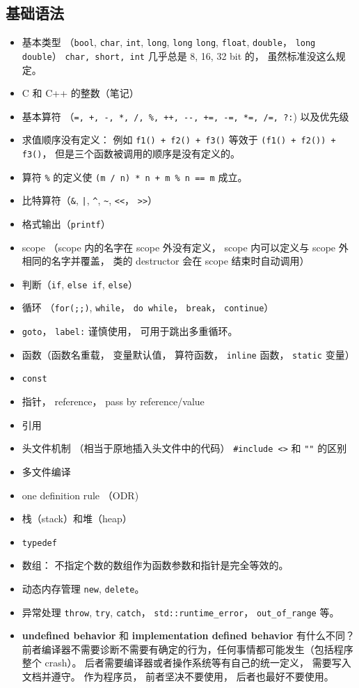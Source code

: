 \subsection{基础语法}
\begin{itemize}
\item 基本类型 （\verb|bool|, \verb|char|, \verb|int|, \verb|long|, \verb|long| \verb|long|, \verb|float|, \verb|double|， \verb|long double|） \verb|char, short, int| 几乎总是 8, 16, 32 bit 的， 虽然标准没这么规定。
\item C 和 C++ 的整数（笔记）
\item 基本算符 （\verb|=, +, -, *, /, %, ++, --, +=, -=, *=, /=, ?:|) 以及优先级
\item 求值顺序没有定义： 例如 \verb|f1() + f2() + f3()| 等效于 \verb|(f1() + f2()) + f3()|， 但是三个函数被调用的顺序是没有定义的。
\item 算符 \verb|%| 的定义使 \verb|(m / n) * n + m % n == m| 成立。
\item 比特算符（\verb|&|, \verb+|+, \verb|^|, \verb|~|, \verb|<<|， \verb|>>|）
\item 格式输出（\verb|printf|）
\item scope （scope 内的名字在 scope 外没有定义， scope 内可以定义与 scope 外相同的名字并覆盖， 类的 destructor 会在 scope 结束时自动调用）
\item 判断（\verb|if|, \verb|else if|, \verb|else|）
\item 循环 （\verb|for(;;)|, \verb|while|， \verb|do while|， \verb|break|， \verb|continue|）
\item \verb|goto|， \verb|label:| 谨慎使用， 可用于跳出多重循环。
\item 函数（函数名重载， 变量默认值， 算符函数， \verb|inline| 函数， \verb|static| 变量）
\item \verb|const|
\item 指针， reference， pass by reference/value
\item 引用
\item 头文件机制 （相当于原地插入头文件中的代码） \verb|#include <>| 和 \verb|""| 的区别
\item 多文件编译
\item one definition rule （ODR)
\item 栈（stack）和堆（heap）
\item \verb|typedef|
\item 数组： 不指定个数的数组作为函数参数和指针是完全等效的。
\item 动态内存管理 \verb|new|, \verb|delete|。
\item 异常处理 \verb|throw|, \verb|try|, \verb|catch|， \verb|std::runtime_error|， \verb|out_of_range| 等。
\item \textbf{undefined behavior} 和 \textbf{implementation defined behavior} 有什么不同？ 前者编译器不需要诊断不需要有确定的行为，任何事情都可能发生（包括程序整个 crash）。 后者需要编译器或者操作系统等有自己的统一定义， 需要写入文档并遵守。 作为程序员， 前者坚决不要使用， 后者也最好不要使用。
\end{itemize}

